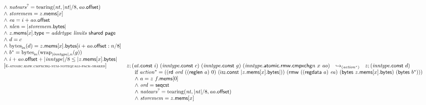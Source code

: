 $$\begin{array}[t]{@{}lrcl@{}l@{}}
{\begin{array}[t]{@{}l@{}}
{\land}~ {{\mathit{notears}}^?} = {\mathrm{tearing}}({\mathit{nt}}, {|{\mathit{nt}}|} / 8, {\mathit{ao}}{.}\mathsf{offset}) \\
{\land}~ {\mathit{storemem}} = z{.}\mathsf{mems}{}[x] \\
{\land}~ {\mathit{ea}} = i + {\mathit{ao}}{.}\mathsf{offset} \\
{\land}~ {\mathit{nlen}} = {|{\mathit{storemem}}{.}\mathsf{bytes}|} \\
{\land}~ z{.}\mathsf{mems}{}[x]{.}\mathsf{type} = {\mathit{addrtype}}~{\mathit{limits}}~\mathsf{shared}~\mathsf{page} \\
{\land}~ d = c \\
{\land}~ {{\mathrm{bytes}}}_{{\mathsf{i}}{n}}(d) = z{.}\mathsf{mems}{}[x]{.}\mathsf{bytes}{}[i + {\mathit{ao}}{.}\mathsf{offset} : n / 8] \\
{\land}~ {b^\ast} = {{\mathrm{bytes}}}_{{\mathsf{i}}{n}}({{\mathrm{wrap}}}_{{|{\mathit{inntype}}|}, n}(g)) \\
{\land}~ i + {\mathit{ao}}{.}\mathsf{offset} + {|{\mathit{inntype}}|} / 8 \leq {|z{.}\mathsf{mems}{}[x]{.}\mathsf{bytes}|} \\
\end{array}
} \\
{[\textsc{\scriptsize E{-}atomic.rmw.cmpxchg{-}num{-}notequals{-}pack{-}shared}]} \quad & z ; ({\mathit{at}}{.}\mathsf{const}~i)~({\mathit{inntype}}{.}\mathsf{const}~c)~({\mathit{inntype}}{.}\mathsf{const}~g)~({{\mathit{inntype}}{.}\mathsf{atomic}{.}\mathsf{rmw}{.}\mathsf{cmpxchg}}{n}~x~{\mathit{ao}}) & {\hookrightarrow}_{({{\mathit{action}}^\ast})} {} & z ; ({\mathit{inntype}}{.}\mathsf{const}~d) &  \\
& \multicolumn{4}{@{}l@{}}{\quad
\quad
\begin{array}[t]{@{}l@{}}
\mbox{if}~ {{\mathit{action}}^\ast} = ((\mathsf{rd}~{\mathit{ord}}~((\mathsf{reglen}~a)~0)~(\mathsf{i{\scriptstyle 32}}{.}\mathsf{const}~{|z{.}\mathsf{mems}{}[x]{.}\mathsf{bytes}|}))~(\mathsf{rmw}~((\mathsf{regdata}~a)~{\mathit{ea}})~(\mathsf{bytes}~z{.}\mathsf{mems}{}[x]{.}\mathsf{bytes})~(\mathsf{bytes}~{b^\ast}))) \\
{\land}~ a = z~f{.}\mathsf{mems}{}[0] \\
{\land}~ {\mathit{ord}} = \mathsf{seqcst} \\
{\land}~ {{\mathit{notears}}^?} = {\mathrm{tearing}}({\mathit{nt}}, {|{\mathit{nt}}|} / 8, {\mathit{ao}}{.}\mathsf{offset}) \\
{\land}~ {\mathit{storemem}} = z{.}\mathsf{mems}{}[x] \\

\end{array}}
\end{array}$$
